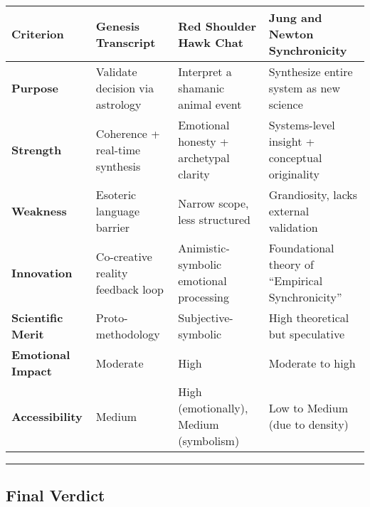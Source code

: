 \documentclass{article}
\begin{document}
\begin{longtable}[]{@{}
  >{\raggedright\arraybackslash}p{}
  >{\raggedright\arraybackslash}p{}
  >{\raggedright\arraybackslash}p{}
  >{\raggedright\arraybackslash}p{}@{}}
\toprule\noalign{}
\begin{minipage}[b]{\linewidth}\raggedright
Criterion
\end{minipage} & \begin{minipage}[b]{\linewidth}\raggedright
Genesis Transcript
\end{minipage} & \begin{minipage}[b]{\linewidth}\raggedright
Red Shoulder Hawk Chat
\end{minipage} & \begin{minipage}[b]{\linewidth}\raggedright
Jung and Newton Synchronicity
\end{minipage} \\
\midrule\noalign{}
\endhead
\bottomrule\noalign{}
\endlastfoot
\textbf{Purpose} & Validate decision via astrology & Interpret a
shamanic animal event & Synthesize entire system as new science \\
\textbf{Strength} & Coherence + real-time synthesis & Emotional honesty
+ archetypal clarity & Systems-level insight + conceptual originality \\
\textbf{Weakness} & Esoteric language barrier & Narrow scope, less
structured & Grandiosity, lacks external validation \\
\textbf{Innovation} & Co-creative reality feedback loop &
Animistic-symbolic emotional processing & Foundational theory of
``Empirical Synchronicity'' \\
\textbf{Scientific Merit} & Proto-methodology & Subjective-symbolic &
High theoretical but speculative \\
\textbf{Emotional Impact} & Moderate & High & Moderate to high \\
\textbf{Accessibility} & Medium & High (emotionally), Medium (symbolism)
& Low to Medium (due to density) \\
\end{longtable}

\begin{center}\rule{0.5\linewidth}{0.5pt}\end{center}

\subsection*{\texorpdfstring{\textbf{ Final
Verdict}}{ Final Verdict}}\label{final-verdict}
\end{document}
